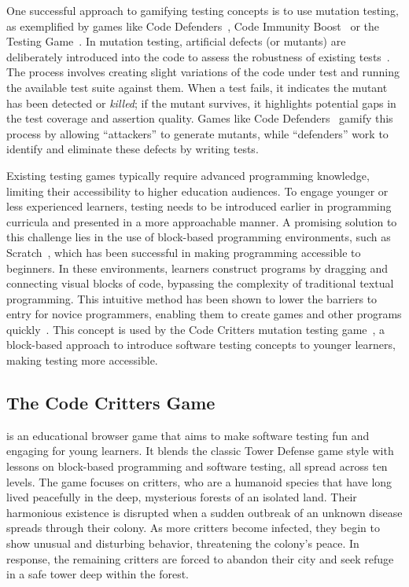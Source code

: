 One successful approach to gamifying testing concepts is to use
mutation testing, as exemplified by games like Code
Defenders~\cite{DBLP:conf/sigcse/FraserGKR19}, Code Immunity
Boost~\cite{hsueh2023design} or the Testing
Game~\cite{DBLP:conf/fie/ValleTBM17}. In mutation testing, artificial
defects (or mutants) are deliberately introduced into the code to
assess the robustness of existing tests~\cite{5487526}. The process
involves creating slight variations of the code under test and running
the available test suite against them. When a test fails, it indicates
the mutant has been detected or \emph{killed}; if the mutant survives,
it highlights potential gaps in the test coverage and assertion
quality. Games like Code Defenders~\cite{DBLP:conf/sigcse/FraserGKR19}
gamify this process by allowing ``attackers'' to generate mutants,
while ``defenders'' work to identify and eliminate these defects by
writing tests.

Existing testing games typically require advanced programming
knowledge, limiting their accessibility to higher education
audiences. To engage younger or less experienced learners, testing
needs to be introduced earlier in programming curricula and presented
in a more approachable manner. A promising solution to this challenge
lies in the use of block-based programming environments, such as
Scratch~\cite{maloney2010scratch}, which has been successful in
making programming accessible to beginners. In these environments,
learners construct programs by dragging and connecting visual blocks
of code, bypassing the complexity of traditional textual
programming. This intuitive method has been shown to lower the
barriers to entry for novice programmers, enabling them to create
games and other programs
quickly~\cite{DBLP:journals/cacm/BauGKST17}. This concept is used by
the Code Critters mutation testing
game~\cite{10675860,DBLP:conf/icst/StraubingerCF23}, a block-based
approach to introduce software testing concepts to younger learners,
making testing more accessible.





\subsection{The Code Critters Game}

\label{sec:codecritters}

\toolname is an educational browser game that aims to make software
testing fun and engaging for young learners. It blends the classic
Tower Defense game style with lessons on block-based programming and
software testing, all spread across ten levels.
%
The game focuses on critters, who are a humanoid species that have
long lived peacefully in the deep, mysterious forests of an isolated
land. Their harmonious existence is disrupted when a sudden outbreak
of an unknown disease spreads through their colony. As more critters
become infected, they begin to show unusual and disturbing behavior,
threatening the colony's peace. In response, the remaining critters
are forced to abandon their city and seek refuge in a safe tower deep
within the forest.

